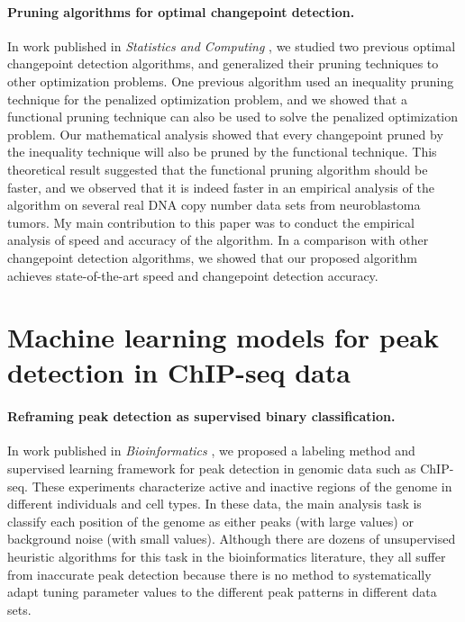 \documentclass{article}
\begin{document}
\paragraph{Pruning algorithms for optimal changepoint detection.} In
work published in \emph{Statistics and Computing} \citep{fpop}, we
studied two previous optimal changepoint detection algorithms, and
generalized their pruning techniques to other optimization
problems. One previous algorithm used an inequality pruning technique
for the penalized optimization problem, and we showed that a
functional pruning technique can also be used to solve the penalized
optimization problem. Our mathematical analysis showed that every
changepoint pruned by the inequality technique will also be pruned by
the functional technique. This theoretical result suggested that the functional
pruning algorithm should be faster, and we observed that it is indeed
faster in an empirical analysis of the algorithm on several real DNA
copy number data sets from neuroblastoma tumors. My main contribution
to this paper was to conduct the empirical analysis of speed and
accuracy of the algorithm. In a comparison with other changepoint
detection algorithms, we showed that our proposed algorithm achieves
state-of-the-art speed and changepoint detection accuracy.

\section{Machine learning models for peak detection in ChIP-seq data}

\paragraph{Reframing peak detection as supervised binary
  classification.} In work published in \emph{Bioinformatics}
\citep{HOCKING-chipseq}, we proposed a labeling method and supervised
learning framework for peak detection in genomic data such as
ChIP-seq. These experiments characterize active and inactive regions
of the genome in different individuals and cell types. In these data,
the main analysis task is classify each position of the genome as
either peaks (with large values) or background noise (with small
values). Although there are dozens of unsupervised heuristic
algorithms for this task in the bioinformatics literature, they all
suffer from inaccurate peak detection because there is no method to
systematically adapt tuning parameter values to the different peak
patterns in different data sets.
\end{document}

